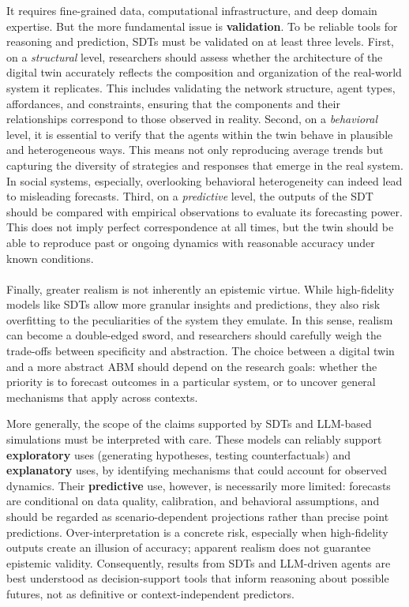 \documentclass[11pt]{article}
\begin{document}
It requires fine-grained data, computational infrastructure, and deep domain expertise.
But the more fundamental issue is \textbf{validation}.
To be reliable tools for reasoning and prediction, SDTs must be validated on at least three levels.
First, on a \textit{structural} level, researchers should assess whether the architecture of the digital twin accurately reflects the composition and organization of the real-world system it replicates.
This includes validating the network structure, agent types, affordances, and constraints, ensuring that the components and their relationships correspond to those observed in reality.
Second, on a \textit{behavioral} level, it is essential to verify that the agents within the twin behave in plausible and heterogeneous ways.
This means not only reproducing average trends but capturing the diversity of strategies and responses that emerge in the real system.
In social systems, especially, overlooking behavioral heterogeneity can indeed lead to misleading forecasts.
Third, on a \textit{predictive} level, the outputs of the SDT should be compared with empirical observations to evaluate its forecasting power.
This does not imply perfect correspondence at all times, but the twin should be able to reproduce past or ongoing dynamics with reasonable accuracy under known conditions.
\\ \ \\
Finally, greater realism is not inherently an epistemic virtue. While high-fidelity models like SDTs allow more granular insights and predictions, they also risk overfitting to the peculiarities of the system they emulate.
In this sense, realism can become a double-edged sword, and researchers should carefully weigh the trade-offs between specificity and abstraction. 
The choice between a digital twin and a more abstract ABM should depend on the research goals: whether the priority is to forecast outcomes in a particular system, or to uncover general mechanisms that apply across contexts. 

\noindent More generally, the scope of the claims supported by SDTs and LLM-based simulations must be interpreted with care.
These models can reliably support \textbf{exploratory} uses (generating hypotheses, testing counterfactuals) and \textbf{explanatory} uses, by identifying mechanisms that could account for observed dynamics.
Their \textbf{predictive} use, however, is necessarily more limited: forecasts are conditional on data quality, calibration, and behavioral assumptions, and should be regarded as scenario-dependent projections rather than precise point predictions.
Over-interpretation is a concrete risk, especially when high-fidelity outputs create an illusion of accuracy; apparent realism does not guarantee epistemic validity.
Consequently, results from SDTs and LLM-driven agents are best understood as decision-support tools that inform reasoning about possible futures, not as definitive or context-independent predictors.



\end{document}
